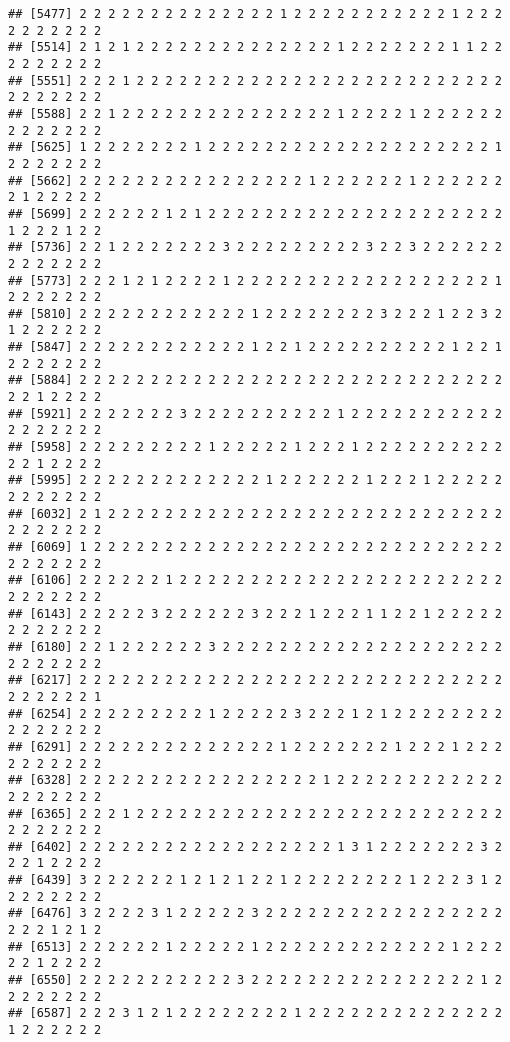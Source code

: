 \documentclass[
]{article}
\begin{document}
\begin{verbatim}
## [5477] 2 2 2 2 2 2 2 2 2 2 2 2 2 2 1 2 2 2 2 2 2 2 2 2 2 2 1 2 2 2 2 2 2 2 2 2 2
## [5514] 2 1 2 1 2 2 2 2 2 2 2 2 2 2 2 2 2 2 1 2 2 2 2 2 2 2 1 1 2 2 2 2 2 2 2 2 2
## [5551] 2 2 2 1 2 2 2 2 2 2 2 2 2 2 2 2 2 2 2 2 2 2 2 2 2 2 2 2 2 2 2 2 2 2 2 2 2
## [5588] 2 2 1 2 2 2 2 2 2 2 2 2 2 2 2 2 2 2 1 2 2 2 2 1 2 2 2 2 2 2 2 2 2 2 2 2 2
## [5625] 1 2 2 2 2 2 2 2 1 2 2 2 2 2 2 2 2 2 2 2 2 2 2 2 2 2 2 2 2 1 2 2 2 2 2 2 2
## [5662] 2 2 2 2 2 2 2 2 2 2 2 2 2 2 2 2 1 2 2 2 2 2 2 1 2 2 2 2 2 2 2 1 2 2 2 2 2
## [5699] 2 2 2 2 2 2 1 2 1 2 2 2 2 2 2 2 2 2 2 2 2 2 2 2 2 2 2 2 2 2 1 2 2 2 1 2 2
## [5736] 2 2 1 2 2 2 2 2 2 2 3 2 2 2 2 2 2 2 2 2 3 2 2 3 2 2 2 2 2 2 2 2 2 2 2 2 2
## [5773] 2 2 2 1 2 1 2 2 2 2 1 2 2 2 2 2 2 2 2 2 2 2 2 2 2 2 2 2 2 1 2 2 2 2 2 2 2
## [5810] 2 2 2 2 2 2 2 2 2 2 2 2 1 2 2 2 2 2 2 2 2 3 2 2 2 1 2 2 3 2 1 2 2 2 2 2 2
## [5847] 2 2 2 2 2 2 2 2 2 2 2 2 1 2 2 1 2 2 2 2 2 2 2 2 2 2 1 2 2 1 2 2 2 2 2 2 2
## [5884] 2 2 2 2 2 2 2 2 2 2 2 2 2 2 2 2 2 2 2 2 2 2 2 2 2 2 2 2 2 2 2 2 1 2 2 2 2
## [5921] 2 2 2 2 2 2 2 3 2 2 2 2 2 2 2 2 2 2 1 2 2 2 2 2 2 2 2 2 2 2 2 2 2 2 2 2 2
## [5958] 2 2 2 2 2 2 2 2 2 1 2 2 2 2 2 1 2 2 2 1 2 2 2 2 2 2 2 2 2 2 2 2 1 2 2 2 2
## [5995] 2 2 2 2 2 2 2 2 2 2 2 2 2 1 2 2 2 2 2 2 1 2 2 2 1 2 2 2 2 2 2 2 2 2 2 2 2
## [6032] 2 1 2 2 2 2 2 2 2 2 2 2 2 2 2 2 2 2 2 2 2 2 2 2 2 2 2 2 2 2 2 2 2 2 2 2 2
## [6069] 1 2 2 2 2 2 2 2 2 2 2 2 2 2 2 2 2 2 2 2 2 2 2 2 2 2 2 2 2 2 2 2 2 2 2 2 2
## [6106] 2 2 2 2 2 2 1 2 2 2 2 2 2 2 2 2 2 2 2 2 2 2 2 2 2 2 2 2 2 2 2 2 2 2 2 2 2
## [6143] 2 2 2 2 2 3 2 2 2 2 2 2 3 2 2 2 1 2 2 2 1 1 2 2 1 2 2 2 2 2 2 2 2 2 2 2 2
## [6180] 2 2 1 2 2 2 2 2 2 3 2 2 2 2 2 2 2 2 2 2 2 2 2 2 2 2 2 2 2 2 2 2 2 2 2 2 2
## [6217] 2 2 2 2 2 2 2 2 2 2 2 2 2 2 2 2 2 2 2 2 2 2 2 2 2 2 2 2 2 2 2 2 2 2 2 2 1
## [6254] 2 2 2 2 2 2 2 2 2 1 2 2 2 2 2 3 2 2 2 1 2 1 2 2 2 2 2 2 2 2 2 2 2 2 2 2 2
## [6291] 2 2 2 2 2 2 2 2 2 2 2 2 2 2 1 2 2 2 2 2 2 2 1 2 2 2 1 2 2 2 2 2 2 2 2 2 2
## [6328] 2 2 2 2 2 2 2 2 2 2 2 2 2 2 2 2 2 1 2 2 2 2 2 2 2 2 2 2 2 2 2 2 2 2 2 2 2
## [6365] 2 2 2 1 2 2 2 2 2 2 2 2 2 2 2 2 2 2 2 2 2 2 2 2 2 2 2 2 2 2 2 2 2 2 2 2 2
## [6402] 2 2 2 2 2 2 2 2 2 2 2 2 2 2 2 2 2 2 1 3 1 2 2 2 2 2 2 2 3 2 2 2 1 2 2 2 2
## [6439] 3 2 2 2 2 2 2 1 2 1 2 1 2 2 1 2 2 2 2 2 2 2 2 1 2 2 2 3 1 2 2 2 2 2 2 2 2
## [6476] 3 2 2 2 2 3 1 2 2 2 2 2 3 2 2 2 2 2 2 2 2 2 2 2 2 2 2 2 2 2 2 2 2 1 2 1 2
## [6513] 2 2 2 2 2 2 1 2 2 2 2 2 1 2 2 2 2 2 2 2 2 2 2 2 2 2 1 2 2 2 2 2 1 2 2 2 2
## [6550] 2 2 2 2 2 2 2 2 2 2 2 3 2 2 2 2 2 2 2 2 2 2 2 2 2 2 2 2 1 2 2 2 2 2 2 2 2
## [6587] 2 2 2 3 1 2 1 2 2 2 2 2 2 2 2 1 2 2 2 2 2 2 2 2 2 2 2 2 2 2 1 2 2 2 2 2 2

\end{verbatim}
\end{document}
